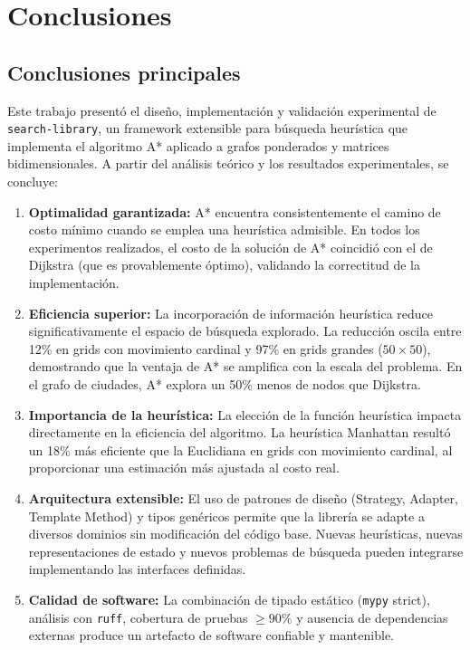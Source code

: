 \section{Conclusiones}

\subsection{Conclusiones principales}

Este trabajo presentó el diseño, implementación y validación experimental de \texttt{search-library}, un framework extensible para búsqueda heurística que implementa el algoritmo A* aplicado a grafos ponderados y matrices bidimensionales. A partir del análisis teórico y los resultados experimentales, se concluye:

\begin{enumerate}
    \item \textbf{Optimalidad garantizada:} A* encuentra consistentemente el camino de costo mínimo cuando se emplea una heurística admisible. En todos los experimentos realizados, el costo de la solución de A* coincidió con el de Dijkstra (que es provablemente óptimo), validando la correctitud de la implementación.
    
    \item \textbf{Eficiencia superior:} La incorporación de información heurística reduce significativamente el espacio de búsqueda explorado. La reducción oscila entre 12\% en grids con movimiento cardinal y 97\% en grids grandes ($50 \times 50$), demostrando que la ventaja de A* se amplifica con la escala del problema. En el grafo de ciudades, A* explora un 50\% menos de nodos que Dijkstra.
    
    \item \textbf{Importancia de la heurística:} La elección de la función heurística impacta directamente en la eficiencia del algoritmo. La heurística Manhattan resultó un 18\% más eficiente que la Euclidiana en grids con movimiento cardinal, al proporcionar una estimación más ajustada al costo real.
    
    \item \textbf{Arquitectura extensible:} El uso de patrones de diseño (Strategy, Adapter, Template Method) y tipos genéricos permite que la librería se adapte a diversos dominios sin modificación del código base. Nuevas heurísticas, nuevas representaciones de estado y nuevos problemas de búsqueda pueden integrarse implementando las interfaces definidas.
    
    \item \textbf{Calidad de software:} La combinación de tipado estático (\texttt{mypy} strict), análisis con \texttt{ruff}, cobertura de pruebas $\geq 90\%$ y ausencia de dependencias externas produce un artefacto de software confiable y mantenible.
\end{enumerate}


